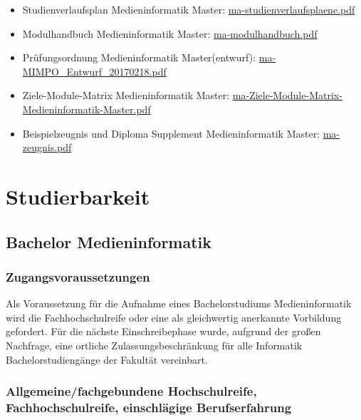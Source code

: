 \begin{itemize}
\tightlist
\item
  Studienverlaufsplan Medieninformatik Master:
  \href{https://th-koeln.github.io/mi-2017/anhaenge/ma-studienverlaufsplaene.pdf}{ma-studienverlaufsplaene.pdf}
\item
  Modulhandbuch Medieninformatik Master:
  \href{https://th-koeln.github.io/mi-2017/anhaenge/ma-modulhandbuch.pdf}{ma-modulhandbuch.pdf}
\item
  Prüfungsordnung Medieninformatik Master(entwurf):
  \href{https://th-koeln.github.io/mi-2017/anhaenge/ma-MIMPO_Entwurf_20170218.pdf}{ma-MIMPO\_Entwurf\_20170218.pdf}
\item
  Ziele-Module-Matrix Medieninformatik Master:
  \href{https://th-koeln.github.io/mi-2017/anhaenge/ma-Ziele-Module-Matrix-Medieninformatik-Master.pdf}{ma-Ziele-Module-Matrix-Medieninformatik-Master.pdf}
\item
  Beispielzeugnis und Diploma Supplement Medieninformatik Master:
  \href{https://th-koeln.github.io/mi-2017/anhaenge/ma-zeugnis.pdf}{ma-zeugnis.pdf}
\end{itemize}

\chapter{Studierbarkeit}\label{studierbarkeit}

\section{Bachelor
Medieninformatik}\label{bachelor-medieninformatik-1}

\subsection{Zugangsvoraussetzungen}\label{zugangsvoraussetzungen}

Als Voraussetzung für die Aufnahme eines Bachelorstudiums
Medieninformatik wird die Fachhochschulreife oder eine als gleichwertig
anerkannte Vorbildung gefordert. Für die nächste Einschreibephase wurde,
aufgrund der großen Nachfrage, eine ortliche Zulassungsbeschränkung für
alle Informatik Bachelorstudiengänge der Fakultät vereinbart.

\subsection{Allgemeine/fachgebundene Hochschulreife,
Fachhochschulreife, einschlägige
Berufserfahrung}\label{allgemeinefachgebundene-hochschulreife-fachhochschulreife-einschluxe4gige-berufserfahrung}

